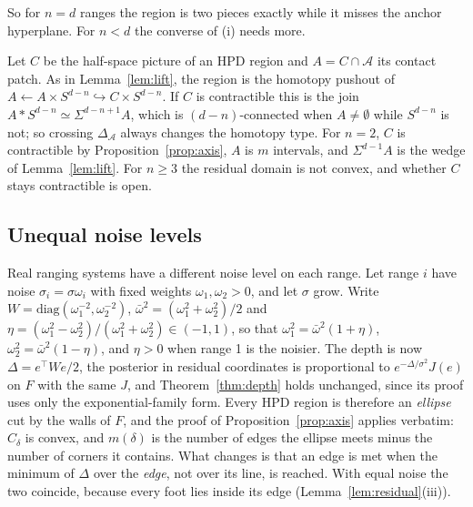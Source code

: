 So for $n = d$ ranges the region is two pieces exactly while it misses the anchor hyperplane. For $n < d$ the
converse of (i) needs more.

\begin{remark}\label{rem:join}
Let $C$ be the half-space picture of an HPD region and $A = C \cap \mathcal A$ its contact patch. As in
Lemma~\ref{lem:lift}, the region is the homotopy pushout of $A \leftarrow A \times S^{d-n} \hookrightarrow C \times S^{d-n}$.
If $C$ is contractible this is the join $A * S^{d-n} \simeq \Sigma^{d-n+1}A$, which is $(d-n)$-connected when
$A \ne \emptyset$ while $S^{d-n}$ is not; so crossing $\Delta_{\mathcal A}$ always changes the homotopy type. For $n = 2$,
$C$ is contractible by Proposition~\ref{prop:axis}, $A$ is $m$ intervals, and $\Sigma^{d-1}A$ is the wedge of
Lemma~\ref{lem:lift}. For $n \ge 3$ the residual domain is not convex, and whether $C$ stays contractible is open.
\end{remark}

\subsection{Unequal noise levels}\label{sec:unequal}

Real ranging systems have a different noise level on each range. Let range $i$ have noise $\sigma_i = \sigma \omega_i$ with
fixed weights $\omega_1, \omega_2 > 0$, and let $\sigma$ grow. Write $W = \mathrm{diag}(\omega_1^{-2}, \omega_2^{-2})$, $\bar\omega^2 = (\omega_1^2 + \omega_2^2)/2$ and
$\eta = (\omega_1^2 - \omega_2^2)/(\omega_1^2 + \omega_2^2) \in (-1, 1)$, so that $\omega_1^2 = \bar\omega^2(1 + \eta)$, $\omega_2^2 = \bar\omega^2(1 - \eta)$, and
$\eta > 0$ when range 1 is the noisier. The depth is now
$\Delta = e^\top We/2$, the posterior in residual coordinates is proportional to $e^{-\Delta/\sigma^2}J(e)$ on $F$ with the
same $J$, and Theorem~\ref{thm:depth} holds unchanged, since its proof uses only the exponential-family form. Every HPD
region is therefore an \emph{ellipse} cut by the walls of $F$, and the proof of Proposition~\ref{prop:axis} applies
verbatim: $C_\delta$ is convex, and $m(\delta)$ is the number of edges the ellipse meets minus the number of corners it
contains. What changes is that an edge is met when the minimum of $\Delta$ over the \emph{edge}, not over its line, is
reached. With equal noise the two coincide, because every foot lies inside its edge (Lemma~\ref{lem:residual}(iii)).

